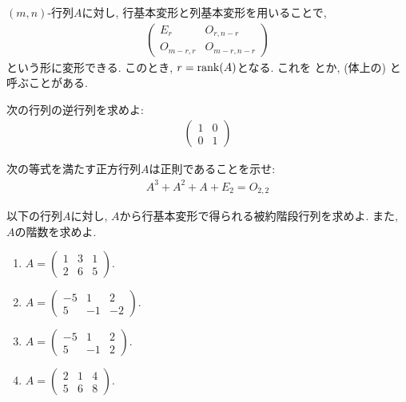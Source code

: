 \begin{remark}
  $(m,n)$-行列$A$に対し,
  行基本変形と列基本変形を用いることで,
  \begin{align*}
    \left(
    \begin{array}{c|c}
      E_r&O_{r,n-r}\\\hline
      O_{m-r,r}&O_{m-r,n-r}
    \end{array}
    \right)
  \end{align*}
  という形に変形できる.
  このとき, $r=\operatorname{rank}(A)$となる.
  これを
とか,
  (体上の)
  と呼ぶことがある.
\end{remark}

\begin{quiz}
  次の行列の逆行列を求めよ:
  \begin{align*}
    \begin{pmatrix}
      1&0\\0&1
    \end{pmatrix}
  \end{align*}
\end{quiz}

\begin{quiz}
  次の等式を満たす正方行列$A$は正則であることを示せ:
  \begin{align*}
    A^3+A^2+A+E_2=O_{2,2}
  \end{align*}
\end{quiz}


\begin{quiz}
  \label{quiz:3:1}

  以下の行列$A$に対し,
   $A$から行基本変形で得られる被約階段行列を求めよ.
  また, $A$の階数を求めよ.
  \begin{enumerate}
    \item
      $A=\begin{pmatrix}1&3&1\\2&6&5\end{pmatrix}$.
    \item
      $A=\begin{pmatrix}-5&1&2\\5&-1&-2\end{pmatrix}$.
    \item
      $A=\begin{pmatrix}-5&1&2\\5&-1&2\end{pmatrix}$.
    \item
      $A=\begin{pmatrix}2&1&4\\5&6&8\end{pmatrix}$.
  \end{enumerate}
\end{quiz}


